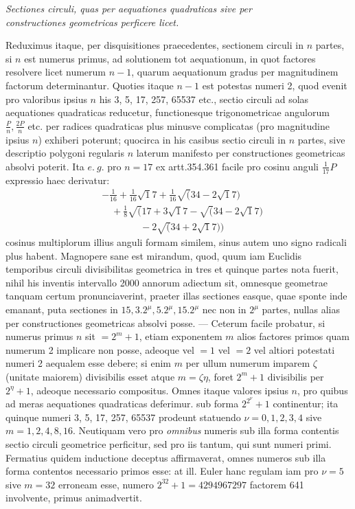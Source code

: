\begin{center}\textit{Sectiones circuli, quas per aequationes quadraticas sive per\\constructiones geometricas perficere licet.}\end{center}


Reduximus itaque, per disquisitiones praecedentes, sectionem circuli in \(n\) partes, si \(n\) est numerus primus, ad solutionem tot aequationum, in quot factores resolvere licet numerum \(n-1\), quarum aequationum gradus per magnitudinem factorum determinantur. Quoties itaque \(n-1\) est potestas numeri 2, quod evenit pro valoribus ipsius \(n\) his 3, 5, 17, 257, 65537 etc., sectio circuli ad solas aequationes quadraticas reducetur, functionesque trigonometricae angulorum \(\frac Pn,\allowbreak \frac{2P}n\) etc. per radices quadraticas plus minusve complicatas (pro magnitudine ipsius \(n\)) exhiberi poterunt; quocirca in his casibus sectio circuli in \(n\) partes, sive descriptio polygoni regularis \(n\) laterum manifesto per constructiones geometricas absolvi poterit. Ita \(e.\ g.\) pro \(n=17\) ex artt.354.361 facile pro cosinu anguli \(\tfrac1{17}P\) expressio haec derivatur: \[\begin{aligned}&-\tfrac1{16}+\tfrac1{16}\surd17+\tfrac1{16}\surd(34-2\surd17)\\&\quad+\tfrac18\surd(17+3\surd17-\surd(34-2\surd17)\\&\qquad\qquad-2\surd(34+2\surd17))\end{aligned}\] cosinus multiplorum illius anguli formam similem, sinus autem uno signo radicali plus habent. Magnopere sane est mirandum, quod, quum iam Euclidis temporibus circuli divisibilitas geometrica in tres et quinque partes nota fuerit, nihil his inventis intervallo 2000 annorum adiectum sit, omnesque geometrae tanquam certum pronunciaverint, praeter illas sectiones easque, quae sponte inde emanant, puta sectiones in \(15,\allowbreak 3.2^\mu,\allowbreak 5.2^\mu,\allowbreak 15.2^\mu\) nec non in \(2^\mu\) partes, nullas alias per constructiones geometricas absolvi posse. — Ceterum facile probatur, si numerus primus \(n\) sit \(=2^m+1\), etiam exponentem \(m\) alios factores primos quam numerum 2 implicare non posse, adeoque vel \(=1\) vel \(=2\) vel altiori potestati numeri 2 aequalem esse debere; si enim \(m\) per ullum numerum imparem \(\zeta\) (unitate maiorem) divisibilis esset atque \(m=\zeta\eta\), foret \(2^m+1\) divisibilis per \(2^\eta+1\), adeoque necessario compositus. Omnes itaque valores ipsius \(n\), pro quibus ad meras aequationes quadraticas deferimur. sub forma \(2^{2^\nu}+1\) continentur; ita quinque numeri 3, 5, 17, 257, 65537 prodeunt statuendo \(\nu=0,\allowbreak 1,\allowbreak 2,\allowbreak 3,\allowbreak 4\) sive \(m=1,\allowbreak 2,\allowbreak 4,\allowbreak 8,\allowbreak 16\). Neutiquam vero pro \textit{omnibus} numeris sub illa forma contentis sectio circuli geometrice perficitur, sed pro iis tantum, qui sunt numeri primi. Fermatius quidem inductione deceptus affirmaverat, omnes numeros sub illa forma contentos necessario primos esse: at ill. Euler hanc regulam iam pro \(\nu=5\) sive \(m=32\) erroneam esse, numero \(2^{32}+1=4294967297\) factorem 641 involvente, primus animadvertit.

